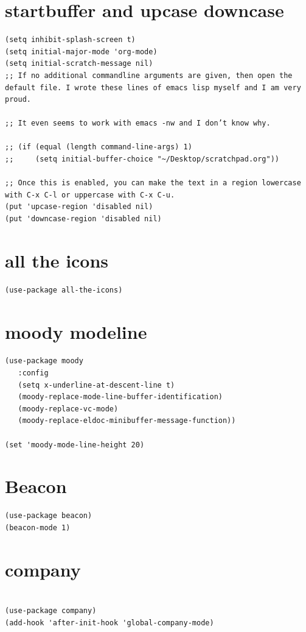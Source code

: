\documentclass[11pt]{article}
\begin{document}
\section{startbuffer and upcase downcase}
\label{sec:org14d08a7}
\begin{verbatim}
(setq inhibit-splash-screen t)
(setq initial-major-mode 'org-mode)
(setq initial-scratch-message nil)
;; If no additional commandline arguments are given, then open the default file. I wrote these lines of emacs lisp myself and I am very proud.

;; It even seems to work with emacs -nw and I don’t know why.

;; (if (equal (length command-line-args) 1)
;;     (setq initial-buffer-choice "~/Desktop/scratchpad.org"))

;; Once this is enabled, you can make the text in a region lowercase with C-x C-l or uppercase with C-x C-u.
(put 'upcase-region 'disabled nil)
(put 'downcase-region 'disabled nil)
\end{verbatim}
\section{all the icons}
\label{sec:orgcec8179}
\begin{verbatim}
(use-package all-the-icons)
\end{verbatim}
\section{moody modeline}
\label{sec:org1604708}
\begin{verbatim}
(use-package moody
   :config
   (setq x-underline-at-descent-line t)
   (moody-replace-mode-line-buffer-identification)
   (moody-replace-vc-mode)
   (moody-replace-eldoc-minibuffer-message-function))

(set 'moody-mode-line-height 20)
\end{verbatim}
\section{Beacon}
\label{sec:org50be406}
\begin{verbatim}
(use-package beacon)
(beacon-mode 1)
\end{verbatim}
\section{company}
\label{sec:org0fa2a8c}
\begin{verbatim}

(use-package company)
(add-hook 'after-init-hook 'global-company-mode)
\end{verbatim}
\end{document}
